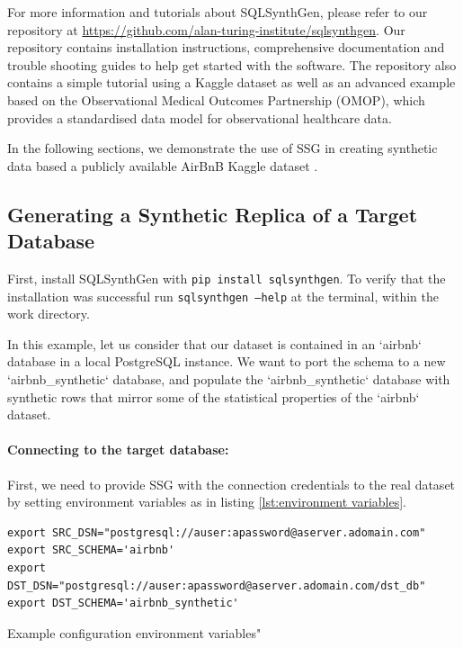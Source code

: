 \documentclass[11pt]{article}
\begin{document}
For more information and tutorials about SQLSynthGen, please refer to our repository at \url{https://github.com/alan-turing-institute/sqlsynthgen}. Our repository \cite{repository} contains installation instructions, comprehensive documentation and trouble shooting guides to help get started with the software. The repository also contains a simple tutorial using a Kaggle dataset \cite{airbnb} as well as an advanced example based on the Observational Medical Outcomes Partnership (OMOP)\cite{omop}, which provides a standardised data model for observational healthcare data. 

In the following sections, we demonstrate the use of SSG in creating synthetic data based a publicly available AirBnB Kaggle dataset \cite{airbnb}.

\subsection{Generating a Synthetic Replica of a Target Database}

 First, install SQLSynthGen with \texttt{pip install sqlsynthgen}. To verify that the installation was successful run \texttt{sqlsynthgen --help} at the terminal, within the work directory. 

In this example, let us consider that our dataset is contained in an `airbnb` database in a local PostgreSQL instance. We want to port the schema to a new `airbnb\_synthetic` database, and populate the `airbnb\_synthetic` database with synthetic rows that mirror some of the statistical properties of the `airbnb` dataset.

\paragraph{Connecting to the target database:}
First, we need to provide SSG with the connection credentials to the real dataset by setting environment variables as in listing \ref{lst:environment variables}.

\begin{listing}[H]
\begin{verbatim}
export SRC_DSN="postgresql://auser:apassword@aserver.adomain.com"
export SRC_SCHEMA='airbnb'
export DST_DSN="postgresql://auser:apassword@aserver.adomain.com/dst_db"
export DST_SCHEMA='airbnb_synthetic'
\end{verbatim}
\caption{Example configuration environment variables"}
\label{lst:environment variables}
\end{listing}
\end{document}
